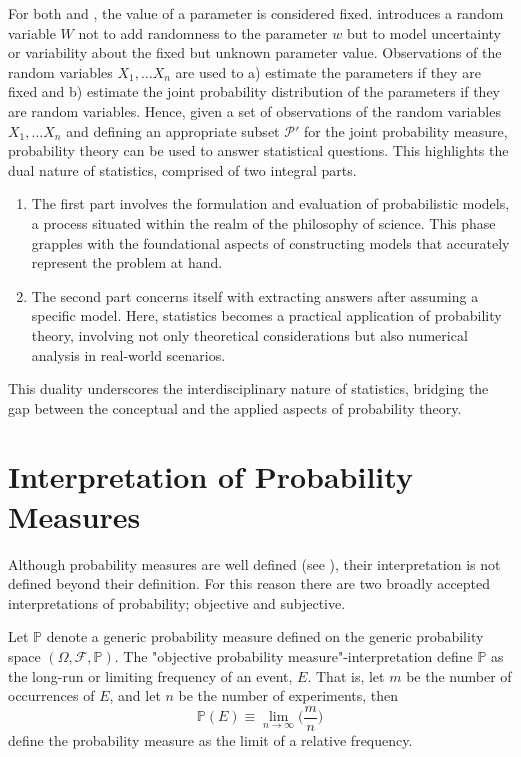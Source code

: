 \begin{remark}
	For both  and , the value of a parameter is considered fixed.  introduces a random variable $W$ not to add randomness to the parameter $w$ but to model uncertainty or variability about the fixed but unknown parameter value. Observations of the random variables $X_1,\dots X_n$ are used to a) estimate the parameters if they are fixed and b) estimate the joint probability distribution of the parameters if they are random variables. Hence, given a set of observations of the random variables $X_1,\dots X_n$ and defining an appropriate subset $\mathcal{P}'$ for the joint probability measure, probability theory can be used to answer statistical questions. This highlights the dual nature of statistics, comprised of two integral parts.
	\begin{enumerate}
		\item The first part involves the formulation and evaluation of probabilistic models, a process situated within the realm of the philosophy of science. This phase grapples with the foundational aspects of constructing models that accurately represent the problem at hand.
		\item The second part concerns itself with extracting answers after assuming a specific model. Here, statistics becomes a practical application of probability theory, involving not only theoretical considerations but also numerical analysis in real-world scenarios.
	\end{enumerate}
	This duality underscores the interdisciplinary nature of statistics, bridging the gap between the conceptual and the applied aspects of probability theory.  
\end{remark}

\section{Interpretation of Probability Measures} 
Although probability measures are well defined (see ), their interpretation is not defined beyond their definition. For this reason there are two broadly accepted interpretations of probability; objective and subjective. 

\begin{definition}
	\label{def:objective_probability}
	Let $\mathbb{P}$ denote a generic probability measure defined on the generic probability space $(\Omega,\mathcal{F},\mathbb{P})$. The "objective probability measure"-interpretation define $\mathbb{P}$ as the long-run or limiting frequency of an event, $E$. That is, let $m$ be the number of occurrences of $E$, and let $n$ be the number of experiments, then~\cite{Leamer1978}
	\begin{equation}
		\mathbb{P}(E) \equiv \lim_{{n \to \infty}} \bigg(\frac{m}{n}\bigg)
	\end{equation}
	define the probability measure as the limit of a relative frequency.
\end{definition}

